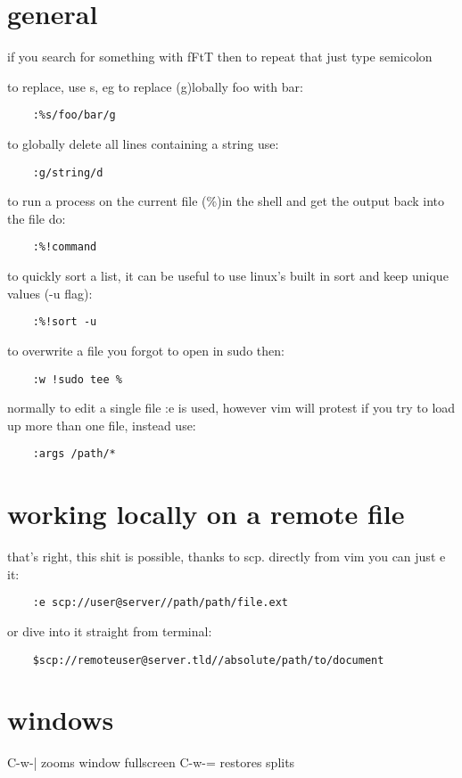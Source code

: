 \section{general}%
\label{sec:general}

if you search for something with fFtT then to repeat that just type semicolon

to replace, use s, eg to replace (g)lobally foo with bar:
\begin{verbatim}
	:%s/foo/bar/g
\end{verbatim}

to globally delete all lines containing a string use:
\begin{verbatim}
	:g/string/d
\end{verbatim}

to run a process on the current file (\%)in the shell and get the output back into the file do:
\begin{verbatim}
	:%!command
\end{verbatim}

to quickly sort a list, it can be useful to use linux's built in sort and keep unique values (-u flag):
\begin{verbatim}
	:%!sort -u
\end{verbatim}

to overwrite a file you forgot to open in sudo then:
\begin{verbatim}
	:w !sudo tee %
\end{verbatim}

normally to edit a single file :e is used, however vim will protest if you try to load up more than one file, instead use:
\begin{verbatim}
	:args /path/*
\end{verbatim}
\section{working locally on a remote file}%
\label{sec:working_locally_on_a_remote_file}

that's right, this shit is possible, thanks to scp. directly from vim you can just e it:
\begin{verbatim}
	:e scp://user@server//path/path/file.ext	
\end{verbatim}
or dive into it straight from terminal:
\begin{verbatim}
	$scp://remoteuser@server.tld//absolute/path/to/document
\end{verbatim}

\section*{windows}%
\label{sec:windows}

C-w-| zooms window fullscreen
C-w-= restores splits
